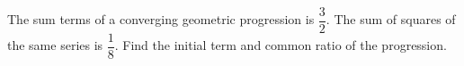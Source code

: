 
%
%
%
%
% 
% 

\question The sum terms of a converging geometric progression is $\dfrac{3}{2}$. The sum of squares of the same series is $\dfrac{1}{8}$. Find the initial term and common ratio of the progression.

\insertQR{}

\ifprintanswers
\fi 

